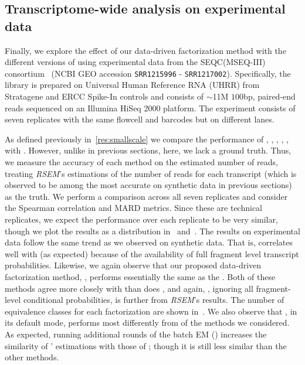 \subsection{Transcriptome-wide analysis on experimental data}

Finally, we explore the effect of our data-driven factorization method with the
different versions of \salmon using experimental data from the SEQC(MSEQ-III)
consortium~\citep{seqc2014comprehensive} (NCBI GEO accession \texttt{SRR1215996}
- \texttt{SRR1217002}). Specifically, the library is prepared on Universal Human
Reference RNA (UHRR) from Stratagene and ERCC Spike-In controls and consists of
$\sim$11M $100$bp, paired-end reads sequenced on an Illumina HiSeq 2000
platform. The experiment consists of seven replicates with the same flowcell and
barcodes but on different lanes.

As defined previously in~\cref{res:smallscale} we compare the performance of
\salmon, \salfm, \salrf, \salu, \express, \expressEM with \rsem. However, unlike
in previous sections, here, we lack a ground truth. Thus, we measure the
accuracy of each method on the estimated number of reads, treating \emph{RSEM}'s
estimations of the number of reads for each transcript (which is observed to be
among the most accurate on synthetic data in previous sections) as the truth. We
perform a comparison across all seven replicates and consider the Spearman
correlation and MARD metrics. Since these are technical replicates, we expect
the performance over each replicate to be very similar, though we plot the
results as a distribution in~ and~. The
results on experimental data follow the same trend as we observed on synthetic
data. That is, \salfm correlates well with \rsem (as expected) because of the
availability of full fragment level transcript probabilities. Likewise, we again
observe that our proposed data-driven factorization method, \salrf, performs
essentially the same as the \fm. Both of these methods agree more closely with
\rsem than does \salmon, and again, \salmonu, ignoring all fragment-level
conditional probabilities, is further from \emph{RSEM}'s results. The number of
equivalence classes for each factorization are shown
in~. We also observe that \express, in its
default mode, performs most differently from \rsem of the methods we considered.
As expected, running additional rounds of the batch EM (\expressEM) increases
the similarity of \express' estimations with those of \rsem; though it is still
less similar than the other methods.
\label{res:expdata}

